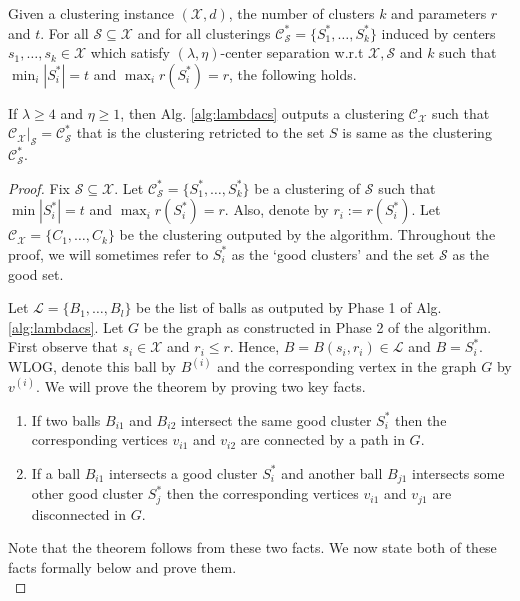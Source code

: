 \documentclass[anon,12pt]{colt2016} %
\newcommand{\mc}{\mathcal}
\begin{document}
\begin{theorem}
\label{thm:lambdacsnoise}
Given a clustering instance $(\mc X, d)$, the number of clusters $k$ and parameters $r$ and $t$. For all $\mc S \subseteq \mc X$ and for all clusterings $\mc C^*_{\mc S} = \{S_1^*, \ldots, S_k^*\}$ induced by centers $s_1, \ldots, s_k \in \mc X$ which satisfy $(\lambda, \eta)$-center separation w.r.t $\mc X, \mc S$ and $k$ such that $ \min_i|S_i^*| = t$ and $\max_i r(S_i^*) = r$, the following holds.

If $\lambda \ge 4$ and $\eta \ge 1$, then Alg. \ref{alg:lambdacs} outputs a clustering $\mc C_{\mc X}$ such that $\mc C_{\mc X}|_{\mc S} = \mc C_{\mc S}^*$ that is the clustering retricted to the set $S$ is same as the clustering $\mc C_{\mc S}^*$.
\end{theorem}
\begin{proof}
Fix $\mc S \subseteq \mc X$. Let $\mc C_{\mc S}^* = \{S_1^*, \ldots, S_k^*\}$ be a clustering of $\mc S$ such that $\min |S_i^*| = t$ and $\max_i r(S_i^*) = r$. Also, denote by $r_i := r(S_i^*)$. Let $\mc C_{\mc X} = \{C_1, \ldots, C_k\}$ be the clustering outputed by the algorithm. Throughout the proof, we will sometimes refer to $S_i^*$ as the `good clusters' and the set $\mc S$ as the good set.

Let $\mc L = \{B_1, \ldots, B_l\}$ be the list of balls as outputed by Phase 1 of Alg. \ref{alg:lambdacs}. Let $G$ be the graph as constructed in Phase 2 of the algorithm. First observe that $s_i \in \mc X$ and $r_i \le r$. Hence, $B = B(s_i, r_i) \in \mc L$ and $B = S_i^*$. WLOG, denote this ball by $B^{(i)}$ and the corresponding vertex in the graph $G$ by $v^{(i)}$. We will prove the theorem by proving two key facts.  

\begin{enumerate}[nolistsep, noitemsep, label=\textbf{F.\arabic*}]
\renewcommand\labelitemi{$\diamond$}
\item \label{fact:lambda1} If two balls $B_{i1}$ and $B_{i2}$ intersect the same good cluster $S_i^*$ then the corresponding vertices $v_{i1}$ and $v_{i2}$ are connected by a path in $G$.
\item \label{fact:lambda2} If a ball $B_{i1}$ intersects a good cluster $S_i^*$ and another ball $B_{j1}$ intersects some other good cluster $S_j^*$ then the corresponding vertices $v_{i1}$ and $v_{j1}$ are disconnected in $G$.	
\end{enumerate}
Note that the theorem follows from these two facts. We now state both of these facts formally below and prove them.\\


\end{proof}
\end{document}
